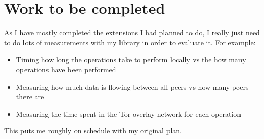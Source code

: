 \documentclass[12pt,a4paper]{article}
\begin{document}
\section*{Work to be completed}
As I have mostly completed the extensions I had planned to do, I really just need to do lots of measurements with my library in order to evaluate it. For example:
\begin{itemize}
	\item Timing how long the operations take to perform locally vs the how many operations have been performed
	\item Measuring how much data is flowing between all peers vs how many peers there are
	\item Measuring the time spent in the Tor overlay network for each operation
\end{itemize} This puts me roughly on schedule with my original plan.
\end{document}
